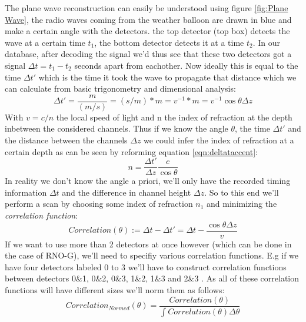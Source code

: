 \documentclass[11pt,a4paper,faculty=we,language=en,doctype=report]{cls/ugent-doc}
\begin{document}
The plane wave reconstruction can easily be understood using figure
\ref{fig:Plane Wave}, the radio waves coming from the weather balloon are drawn
in blue and make a certain angle with the detectors. the top detector (top box)
detects the wave at a certain time $t_1$, the bottom detector detects it at a
time $t_2$. In our database, after decoding the signal we'd thus see that these
two detectors got a signal $\Delta t = t_1 - t_2$ seconds apart from eachother.
Now ideally this is equal to the time $\Delta t'$ which is the time it took the
wave to propagate that distance which we can calculate from basic trigonometry
and dimensional analysis:
\begin{equation}
	\Delta t' = \frac{m}{(m/s)} = (s/m)*m = v^{-1} * m = v^{-1} \cos\theta \Delta z
	\label{eqn:deltataccent}
\end{equation}
With $v = c/n$ the local speed of light and n the index of refraction at the depth inbetween
the considered channels. 
Thus if we know the angle $\theta$, the time $\Delta t'$ and the distance between the channels $\Delta z$
we could infer the index of refraction at a certain depth as can be seen by reforming equation \ref{eqn:deltataccent}:
\begin{equation}
	n = \frac{\Delta t'}{\Delta z} \frac{c}{\cos\theta}
	\label{eqn:deltataccent}
\end{equation}
In reality we don't know the angle a priori, we'll only have the recorded
timing information $\Delta t$ and the difference in channel height $\Delta z$.
So to this end we'll perform a scan by choosing some index of refraction $n_1$ and
minimizing the \textit{correlation function}:
\begin{equation}
	Correlation(\theta) := \Delta t - \Delta t' = \Delta t
	- \frac{\cos\theta \Delta z}{v}
  \label{eqn:PlaneWave}
\end{equation}
If we want to use more than 2 detectors at once however (which can be done in
the case of RNO-G), we'll need to specifiy various correlation functions.  E.g
if we have four detectors labeled 0 to 3 we'll have to construct correlation
functions between detectors 0\&1, 0\&2, 0\&3, 1\&2, 1\&3 and 2\&3 .  As all of
these correlation functions will have different sizes we'll norm them as
follows:
\begin{equation}
	Correlation_{Normed}(\theta) =
	\frac{Correlation(\theta)}{\int Correlation(\theta)\Delta
	\theta}
\end{equation}
\end{document}
